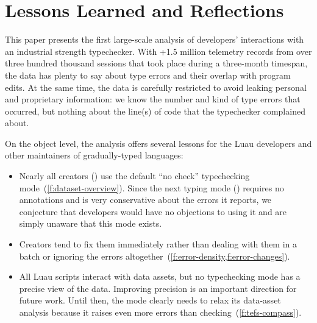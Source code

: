 \documentclass[english,submission,cleveref]{programming}
\begin{document}



\section{Lessons Learned and Reflections}
\label{s:conclusion}

This paper presents the first large-scale analysis of developers' interactions with
an industrial strength typechecker.
With +1.5 million telemetry records from over three hundred thousand sessions
that took place during a three-month timespan, the data has plenty to say about
type errors and their overlap with program edits.
At the same time, the data is carefully restricted to avoid leaking personal
and proprietary information: we know the number and kind of type errors
that occurred, but nothing about the line(s) of code that the typechecker
complained about.

On the object level, the analysis offers several lessons for the Luau
developers and other maintainers of gradually-typed languages:
\begin{itemize}
  \item
    Nearly all creators () use the default ``no check''
    typechecking mode~(\cref{f:dataset-overview}).
    Since the next typing mode (\mnonstrict{}) requires no annotations and is
    very conservative about the errors it reports, we conjecture that
    developers would have no objections to using it and are simply unaware that
    this mode exists.
  \item
    Creators tend to fix them immediately rather than dealing with them in a batch
    or ignoring the errors altogether~(\cref{f:error-density,f:error-changes}).
  \item
    All Luau scripts interact with data assets, but no typechecking mode
    has a precise view of the data.
    Improving precision is an important direction for future work.
    Until then, the \mstrict{} mode clearly needs to relax its data-asset
    analysis because it raises even more errors than \FS{} checking~(\cref{f:tefs-compass}).
\end{itemize}
\end{document}
